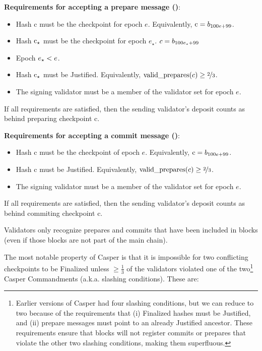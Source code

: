 \documentclass[12pt]{article}
\newcommand{\epoch}{\ensuremath{e}\xspace}
\newcommand{\hash}{\textnormal{c}\xspace}
\newcommand{\epochsource}{\ensuremath{\epoch_{\star}}\space}
\newcommand{\hashsource}{\ensuremath{\hash_{\star}}\xspace}
\newcommand{\msgCOMMIT}{\textbf{\textsc{commit}}\xspace}
\begin{document}

\textbf{Requirements for accepting a prepare message ()}:
\begin{itemize}
\item Hash \hash must be the checkpoint for epoch \epoch.  Equivalently, $\hash = b_{100\epoch + 99}$.
\item Hash \hashsource must be the checkpoint for epoch \epochsource.  $c = b_{100\epochsource + 99}$
\item Epoch $\epochsource < \epoch$.
\item Hash \hashsource must be Justified.  Equivalently, $\textnormal{valid\_prepares}(c) \geq \nicefrac{2}{3}$.
\item The signing validator must be a member of the validator set for epoch \epoch.
\end{itemize}
If all requirements are satisfied, then the sending validator's deposit counts as behind preparing checkpoint \hash.




\textbf{Requirements for accepting a commit message ()}:
\begin{itemize}
\item Hash \hash must be the checkpoint of epoch \epoch.  Equivalently, $\hash = b_{100\epoch + 99}$.
\item Hash \hash must be Justified.  Equivalently, $\textnormal{valid\_prepares}(c) \geq \nicefrac{2}{3}$.
\item The signing validator must be a member of the validator set for epoch \epoch.
\end{itemize}
If all requirements are satisfied, then the sending validator's deposit counts as behind commiting checkpoint \hash.

Validators only recognize prepares and commits that have been included in blocks (even if those blocks are not part of the main chain). 

The most notable property of Casper is that it is impossible for two conflicting checkpoints to be Finalized unless $\geq \frac{1}{3}$ of the validators violated one of the two\footnote{Earlier versions of Casper had four slashing conditions,\cite{minslashing} but we can reduce to two because of the requirements that (i) Finalized hashes must be Justified, and (ii) prepare messages must point to an already Justified ancestor.  These requirements ensure that blocks will not register commits or prepares that violate the other two slashing conditions, making them superfluous.} Casper Commandments (a.k.a. slashing conditions).  These are:
\end{document}
